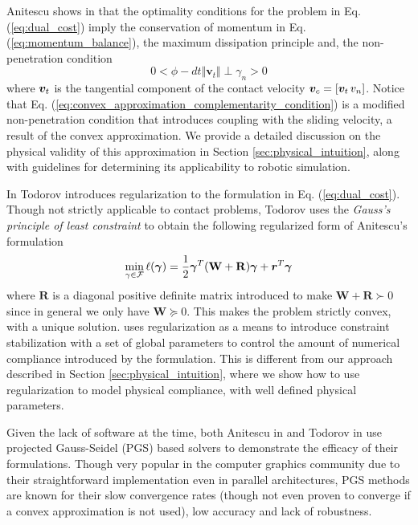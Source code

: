 Anitescu shows in \cite{bib:anitescu2006} that the optimality conditions for the
problem in Eq. (\ref{eq:dual_cost}) imply the conservation of momentum in Eq.
(\ref{eq:momentum_balance}), the maximum dissipation principle and, the
non-penetration condition
\begin{equation}
	0 < \phi - dt \Vert {\bm v}_t \Vert \perp \gamma_n > 0
	\label{eq:convex_approximation_complementarity_condition}
\end{equation}
where ${\bm{v}}_t$ is the tangential component of the contact velocity ${\bm{v}}_c =
[{\bm{v}}_t\,v_n]$. Notice that Eq.
(\ref{eq:convex_approximation_complementarity_condition}) is a modified
non-penetration condition that introduces coupling with the sliding velocity, a
result of the convex approximation. We provide a detailed discussion on the
physical validity of this approximation in Section \ref{sec:physical_intuition},
along with guidelines for determining its applicability to robotic simulation.

In \cite{bib:todorov2011, bib:todorov2014} Todorov introduces regularization to
the formulation in Eq. (\ref{eq:dual_cost}). Though not strictly applicable to
contact problems, Todorov uses the \emph{Gauss's principle of least
constraint} to obtain the following regularized form of Anitescu's formulation
\begin{eqnarray}
	\min_{\gamma\in \mathcal{F}} \ell(\bgamma) =
	\frac{1}{2}\bgamma^T(\mathbf{W}+\mathbf{R})\bgamma + {\bm r}^T
	\bgamma
	\label{eq:dual_regularized}
\end{eqnarray}
where $\mathbf{R}$ is a diagonal positive definite matrix introduced to
make $\mathbf{W}+\mathbf{R}\succ 0$ since in general we only have $\mathbf{W}
\succeq 0$. This makes the problem strictly convex, with a unique solution.
\cite{bib:todorov2014} uses regularization as a means to introduce constraint
stabilization with a set of global parameters to control the amount of numerical
compliance introduced by the formulation. This is different from our approach
described in Section \ref{sec:physical_intuition}, where we show how to use
regularization to model physical compliance, with well defined physical
parameters.

Given the lack of software at the time, both Anitescu in \cite{bib:anitescu2010}
and Todorov in \cite{bib:todorov2014} use projected Gauss-Seidel (PGS) based
solvers to demonstrate the efficacy of their formulations. Though very popular
in the computer graphics community due to their straightforward implementation
even in parallel architectures, PGS methods are known for their slow convergence
rates (though not even proven to converge if a convex approximation is not
used), low accuracy and lack of robustness.

